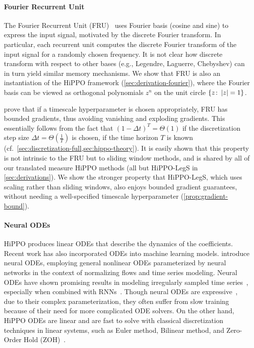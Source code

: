 \documentclass[../hippo.tex]{subfiles}
\begin{document}
\paragraph{Fourier Recurrent Unit}

The Fourier Recurrent Unit (FRU)~\citep{zhang2018learning} uses Fourier basis
(cosine and sine) to express the input signal, motivated by the discrete Fourier
transform.
In particular, each recurrent unit computes the discrete Fourier transform of
the input signal for a randomly chosen frequency.
It is not clear how discrete transform with respect to other bases (e.g.,
Legendre, Laguerre, Chebyshev) can in turn yield similar memory mechanisms.
We show that FRU is also an instantiation of the HiPPO framework
(\cref{sec:derivation-fourier}), where the Fourier basis can be viewed as
orthogonal polynomials $z^n$ on the unit circle $\{ z \colon \left\lvert z\right\rvert = 1 \}$.

\citet{zhang2018learning} prove that if a timescale hyperparameter is chosen appropriately,
FRU has bounded gradients, thus avoiding vanishing and exploding gradients.
This essentially follows from the fact that $(1 - \Delta t)^T = \Theta(1)$ if the discretization
step size $\Delta t = \Theta(\frac{1}{T})$ is chosen, if the time horizon $T$ is known (cf.\ \cref{sec:discretization-full,sec:hippo-theory}).
It is easily shown that this property is not intrinsic to the FRU but to sliding window methods,
and is shared by all of our translated measure HiPPO methods (all but HiPPO-LegS in \cref{sec:derivations}).
We show the stronger property that HiPPO-LegS, which uses scaling rather than sliding windows, also enjoys bounded gradient guarantees,
without needing a well-specified timescale hyperparameter (\cref{prop:gradient-bound}).

\paragraph{Neural ODEs}

HiPPO produces linear ODEs that describe the dynamics of the coefficients.
Recent work has also incorporated ODEs into machine learning models.
\citet{chen2018neural} introduce neural ODEs, employing general nonlinear ODEs
parameterized by neural networks in the context of normalizing flows and time
series modeling.
Neural ODEs have shown promising results in modeling irregularly sampled time
series~\citep{kidger2020neural}, especially when combined with
RNNs~\citep{rubanova2019latent}.
Though neural ODEs are expressive~\citep{dupont2019augmented, zhang2019approximation},
due to their complex parameterization, they often suffer from slow
training~\citep{quaglino2020snode, finlay2020train, massaroli2020stable} because
of their need for more complicated ODE solvers.
On the other hand, HiPPO ODEs are linear and are fast to solve with classical
discretization techniques in linear systems, such as Euler method, Bilinear
method, and Zero-Order Hold (ZOH)~\citep{iserles2009first}.
\end{document}
